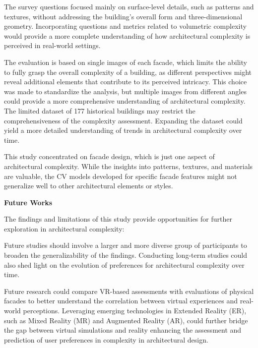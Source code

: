 The survey questions focused mainly on surface-level details, such as patterns and textures, without addressing the building's overall form and three-dimensional geometry.
Incorporating questions and metrics related to volumetric complexity would provide a more complete understanding of how architectural complexity is perceived in real-world settings.

The evaluation is based on single images of each facade, which limits the ability to fully grasp the overall complexity of a building, as different perspectives might reveal additional elements that contribute to its perceived intricacy.
This choice was made to standardize the analysis, but multiple images from different angles could provide a more comprehensive understanding of architectural complexity.
The limited dataset of 177 historical buildings may restrict the comprehensiveness of the complexity assessment.
Expanding the dataset could yield a more detailed understanding of trends in architectural complexity over time.

This study concentrated on facade design, which is just one aspect of architectural complexity.
While the insights into patterns, textures, and materials are valuable, the CV models developed for specific facade features might not generalize well to other architectural elements or styles.


\textbf{Future Works}

The findings and limitations of this study provide opportunities for further exploration in architectural complexity:

Future studies should involve a larger and more diverse group of participants to broaden the generalizability of the findings.
Conducting long-term studies could also shed light on the evolution of preferences for architectural complexity over time.

Future research could compare VR-based assessments with evaluations of physical facades to better understand the correlation between virtual experiences and real-world perceptions.
Leveraging emerging technologies in Extended Reality (ER), such as Mixed Reality (MR) and Augmented Reality (AR), could further bridge the gap between virtual simulations and reality enhancing the assessment and prediction of user preferences in complexity in architectural design.

